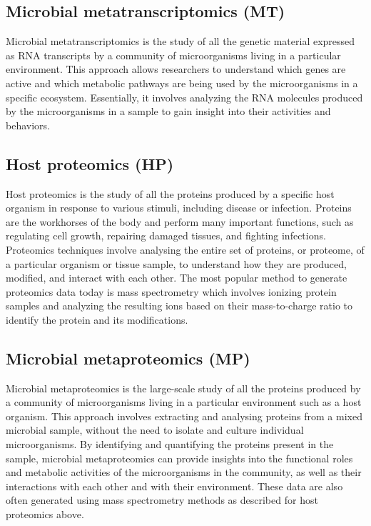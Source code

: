 \documentclass[
]{book}
\begin{document}
\hypertarget{microbial-metatranscriptomics}{%
\subsection*{Microbial metatranscriptomics (MT)}\label{microbial-metatranscriptomics}}

Microbial metatranscriptomics is the study of all the genetic material expressed as RNA transcripts by a community of microorganisms living in a particular environment. This approach allows researchers to understand which genes are active and which metabolic pathways are being used by the microorganisms in a specific ecosystem. Essentially, it involves analyzing the RNA molecules produced by the microorganisms in a sample to gain insight into their activities and behaviors.

\hypertarget{host-proteomics}{%
\subsection*{Host proteomics (HP)}\label{host-proteomics}}

Host proteomics is the study of all the proteins produced by a specific host organism in response to various stimuli, including disease or infection. Proteins are the workhorses of the body and perform many important functions, such as regulating cell growth, repairing damaged tissues, and fighting infections. Proteomics techniques involve analysing the entire set of proteins, or proteome, of a particular organism or tissue sample, to understand how they are produced, modified, and interact with each other. The most popular method to generate proteomics data today is mass spectrometry which involves ionizing protein samples and analyzing the resulting ions based on their mass-to-charge ratio to identify the protein and its modifications.

\hypertarget{microbial-metaproteomics}{%
\subsection*{Microbial metaproteomics (MP)}\label{microbial-metaproteomics}}

Microbial metaproteomics is the large-scale study of all the proteins produced by a community of microorganisms living in a particular environment such as a host organism. This approach involves extracting and analysing proteins from a mixed microbial sample, without the need to isolate and culture individual microorganisms. By identifying and quantifying the proteins present in the sample, microbial metaproteomics can provide insights into the functional roles and metabolic activities of the microorganisms in the community, as well as their interactions with each other and with their environment. These data are also often generated using mass spectrometry methods as described for host proteomics above.
\end{document}
